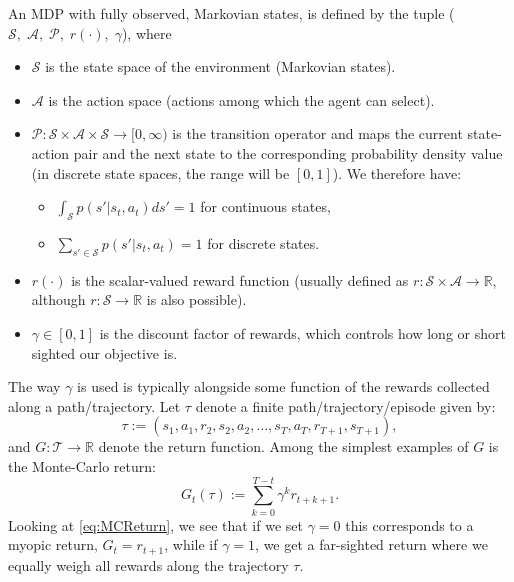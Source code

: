 \documentclass{report}
\newcommand{\reals}{\mbox{\(\mathbb R\)}}
\numberwithin{equation}{section}
\numberwithin{figure}{section}
\numberwithin{table}{section}
\numberwithin{algorithm}{section}
\begin{document}
An MDP with fully observed, Markovian states, is defined by the tuple 
($\mathcal{S},\; \mathcal{A},\; \mathcal{P},\; r(\cdot),\; \gamma$), where
\begin{itemize}
  \item $\mathcal{S}$ is the state space of the environment 
    (Markovian states).
  \item $\mathcal{A}$ is the action space (actions among which 
    the agent can select).
  \item $\mathcal{P}:\mathcal{S}\times \mathcal{A}\times \mathcal{S}\rightarrow [0, \infty)$ 
    is the transition operator and maps 
    the current state-action pair and the next state to the 
    corresponding probability density value (in discrete state spaces, 
    the range will be $[0, 1]$). We therefore have:
    \begin{itemize}
      \item $\int_{\mathcal{S}}p(s'|s_t, a_t)ds'=1$ for continuous states,
      \item $\sum_{s'\in\mathcal{S}}p(s'|s_t, a_t)=1$ for discrete states.
    \end{itemize}
     
  \item $r(\cdot)$ is the scalar-valued reward function 
    (usually defined as $r:\mathcal{S}\times \mathcal{A}\rightarrow \reals$, 
    although $r:\mathcal{S}\rightarrow \reals$ is also possible).
  \item $\gamma\in [0, 1]$ is the discount factor of rewards, which controls 
    how long or short sighted our objective is.
\end{itemize} 

The way $\gamma$ is used is typically alongside some function of 
the rewards collected along a path/trajectory. Let $\tau$ denote a 
finite path/trajectory/episode given by:
\begin{equation}
  \tau:=(s_1, a_1, r_2, s_2, a_2, \ldots, s_T, a_T, r_{T+1}, s_{T+1}),\label{eq:tau} 
\end{equation} 
and $G:\mathcal{T}\rightarrow \reals$ denote the return 
function. Among the simplest examples of $G$ is the Monte-Carlo 
return:
\begin{equation}
  G_t(\tau):=\sum_{k=0}^{T-t}\gamma^kr_{t+k+1}.\label{eq:MCReturn}
\end{equation}
Looking at \eqref{eq:MCReturn}, we see that if we set $\gamma=0$ 
this corresponds to a myopic return, $G_t=r_{t+1}$, while if 
$\gamma=1$, we get a far-sighted return where we equally weigh 
all rewards along the trajectory $\tau$.
\end{document}
